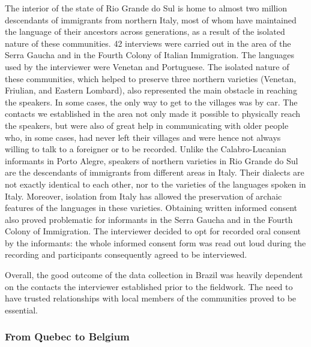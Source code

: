 \documentclass[output=paper,hidelinks]{langscibook}
\begin{document}
The interior of the state of Rio Grande do Sul is home to almost two million descendants of immigrants from northern Italy, most of whom have maintained the language of their ancestors across generations, as a result of the isolated nature of these communities. 42 interviews were carried out in the area of the Serra Gaucha and in the Fourth Colony of Italian Immigration. The languages used by the interviewer were Venetan and Portuguese. The isolated nature of these communities, which helped to preserve three northern varieties (Venetan, Friulian, and Eastern Lombard), also represented the main obstacle in reaching the speakers. In some cases, the only way to get to the villages was by car. The contacts we established in the area not only made it possible to physically reach the speakers, but were also of great help in communicating with older people who, in some cases, had never left their villages and were hence not always willing to talk to a foreigner or to be recorded. Unlike the Calabro-Lucanian informants in Porto Alegre, speakers of northern varieties in Rio Grande do Sul are the descendants of immigrants from different areas in Italy. Their dialects are not exactly identical to each other, nor to the varieties of the languages spoken in Italy. Moreover, isolation from Italy has allowed the preservation of archaic features of the languages in these varieties. Obtaining written informed consent also proved problematic for informants in the Serra Gaucha and in the Fourth Colony of Immigration. The interviewer decided to opt for recorded oral consent by the informants: the whole informed consent form was read out loud during the recording and participants consequently agreed to be interviewed.

Overall, the good outcome of the data collection in Brazil was heavily dependent on the contacts the interviewer established prior to the fieldwork. The need to have trusted relationships with local members of the communities proved to be essential.

\subsubsection{From Quebec to Belgium}
\end{document}
